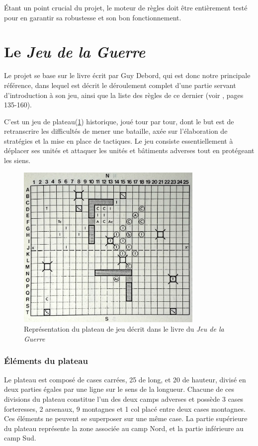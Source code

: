\documentclass[a4paper]{report}
\begin{document}
Étant un point crucial du projet, le moteur de règles doit être entièrement testé pour en garantir sa robustesse et son bon fonctionnement.

\section{Le \textit{Jeu de la Guerre}}

Le projet se base sur le livre\cite{jdg} écrit par Guy Debord, qui est donc notre principale référence, dans lequel est décrit le déroulement complet d'une partie servant d'introduction à son jeu, ainsi que la liste des règles de ce dernier (voir \cite{jdg}, pages 135-160).

C'est un jeu de plateau(\ref{fig:illu_livre}) historique, joué tour par tour, dont le but est de retranscrire les difficultés de mener une bataille, axée sur l'élaboration de stratégies et la mise en place de tactiques.
Le jeu consiste essentiellement à déplacer ses unités et attaquer les unités et bâtiments adverses tout en protégeant les siens.

\begin{figure}[!h]
\centering
\label{fig:illu_livre}
\includegraphics[width=0.8\textwidth]{livre}
\caption{Représentation du plateau de jeu décrit dans le livre du \textit{Jeu de la Guerre}}
\end{figure}

\subsubsection*{\'Eléments du plateau}
Le plateau est composé de cases carrées, 25 de long, et 20 de hauteur, divisé en deux parties égales par une ligne sur le sens de la longueur. Chacune de ces divisions du plateau constitue l'un des deux camps adverses et possède 3 cases forteresses, 2 arsenaux, 9 montagnes et 1 col placé entre deux cases montagnes. Ces éléments ne peuvent se superposer sur une même case. La partie supérieure du plateau représente la zone associée au camp Nord, et la partie inférieure au camp Sud.
\end{document}
